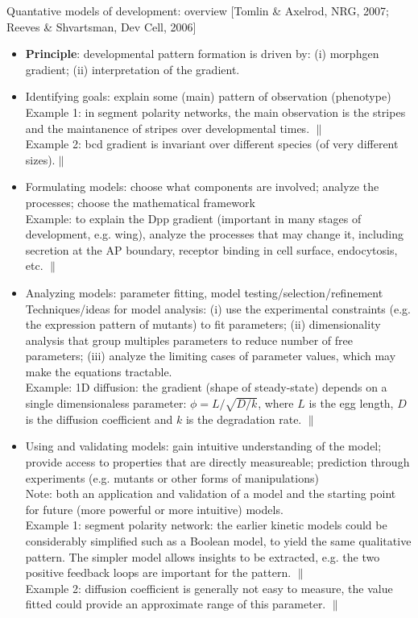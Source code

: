 \documentclass{report}
\begin{document}
Quantative models of development: overview [Tomlin \& Axelrod, NRG, 2007; Reeves \& Shvartsman, Dev Cell, 2006]
\begin{itemize}
\item \textbf{Principle}: developmental pattern formation is driven by: (i) morphgen gradient; (ii) interpretation of the gradient.

\item{}Identifying goals: explain some (main) pattern of observation (phenotype)\\
Example 1: in segment polarity networks, the main observation is the stripes and the maintanence of stripes over developmental times. $\|$\\
Example 2: bcd gradient is invariant over different species (of very different sizes).$\|$
\item{}Formulating models: choose what components are involved; analyze the processes; choose the mathematical framework\\
Example: to explain the Dpp gradient (important in many stages of development, e.g. wing), analyze the processes that may change it, including secretion at the AP boundary, receptor binding in cell surface, endocytosis, etc. $\|$
\item{}Analyzing models: parameter fitting, model testing/selection/refinement\\
Techniques/ideas for model analysis: (i) use the experimental constraints (e.g. the expression pattern of mutants) to fit parameters; (ii) dimensionality analysis that group multiples parameters to reduce number of free parameters; (iii) analyze the limiting cases of parameter values, which may make the equations tractable. \\
Example: 1D diffusion: the gradient (shape of steady-state) depends on a single dimensionaless parameter: $\phi = L / \sqrt{D/k}$, where $L$ is the egg length, $D$ is the diffusion coefficient and $k$ is the degradation rate. $\|$
\item{}Using and validating models: gain intuitive understanding of the model; provide access to properties that are directly measureable; prediction through experiments (e.g. mutants or other forms of manipulations)\\
Note: both an application and validation of a model and the starting point for future (more powerful or more intuitive) models.\\
Example 1: segment polarity network: the earlier kinetic models could be considerably simplified such as a Boolean model, to yield the same qualitative pattern. The simpler model allows insights to be extracted, e.g. the two positive feedback loops are important for the pattern. $\|$ \\
Example 2: diffusion coefficient is generally not easy to measure, the value fitted could provide an approximate range of this parameter. $\|$
\end{itemize}
\end{document}
